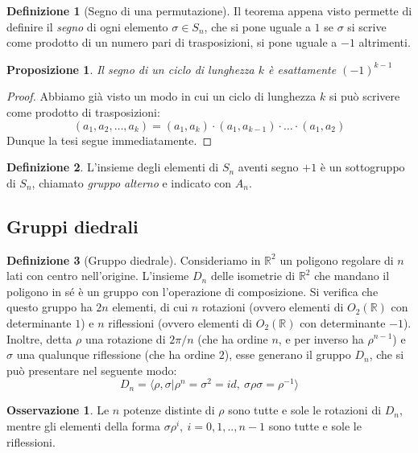 \documentclass[11pt]{article}
\theoremstyle{plain}
\newtheorem{prop}[thm]{Proposizione}
\theoremstyle{definition}
\newtheorem{defn}{Definizione}[section]
\newtheorem*{rem}{Osservazione}
\theoremstyle{remark}
\newcommand{\R}{\mathbb{R}}
\begin{document}
\begin{defn}[Segno di una permutazione]
Il teorema appena visto permette di definire il \emph{segno} di ogni elemento $\sigma\in S_n$, che si pone uguale a $1$
se $\sigma$ si scrive come prodotto di un numero pari di trasposizioni, si pone uguale a $-1$ altrimenti.
\end{defn}

\begin{prop}
Il segno di un ciclo di lunghezza $k$ è esattamente $(-1)^{k-1}$
\end{prop}
\begin{proof}
Abbiamo già visto un modo in cui un ciclo di lunghezza $k$ si può scrivere come prodotto di trasposizioni:
\[(a_1, a_2, \dots, a_k) = (a_1, a_k)\cdot (a_1, a_{k-1}) \cdot \dots \cdot (a_1, a_2)\]
Dunque la tesi segue immediatamente.
\end{proof}

\begin{defn}
L'insieme degli elementi di $S_n$ aventi segno $+1$ è un sottogruppo di $S_n$,
chiamato \emph{gruppo alterno} e indicato con $A_n$.
\end{defn}


\subsection{Gruppi diedrali}

\begin{defn}[Gruppo diedrale]
Consideriamo in $\R^2$ un poligono regolare di $n$ lati con centro nell'origine.
L'insieme $D_n$ delle isometrie di $\R^2$ che mandano il poligono in sé è un gruppo con l'operazione di composizione.
Si verifica che questo gruppo ha $2n$ elementi, di cui $n$ rotazioni (ovvero elementi di $O_2(\R)$ con determinante $1$)
e $n$ riflessioni (ovvero elementi di $O_2(\R)$ con determinante $-1$).
Inoltre, detta $\rho$ una rotazione di $2\pi/n$ (che ha ordine $n$, e per inverso ha $\rho^{n-1}$) e $\sigma$ una qualunque riflessione (che ha ordine $2$), esse generano
il gruppo $D_n$, che si può presentare nel seguente modo: $$D_n=\langle\rho,\sigma|\rho^n=\sigma^2=id,\ \sigma\rho\sigma=\rho^{-1}\rangle$$
\end{defn}

\begin{rem}
 Le $n$ potenze distinte di $\rho$ sono tutte e sole le rotazioni di $D_n$, mentre gli elementi della forma $\sigma\rho^{i},\ i=0,1,..,n-1$
 sono tutte e sole le riflessioni.
\end{rem}
\end{document}
